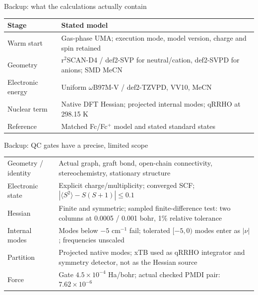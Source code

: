 \begin{frame}{Backup: what the calculations actually contain}
\centering\renewcommand{\arraystretch}{1.5}\small
\begin{tabular}{@{}lp{9.4cm}@{}}\toprule
Stage & Stated model\\\midrule
Warm start & Gas-phase UMA; execution mode, model version, charge and spin retained\\
Geometry & r$^2$SCAN-D4 / def2-SVP for neutral/cation, def2-SVPD for anions; SMD MeCN\\
Electronic energy & Uniform $\omega$B97M-V / def2-TZVPD, VV10, MeCN\\
Nuclear term & Native DFT Hessian; projected internal modes; qRRHO at 298.15 K\\
Reference & Matched Fc/Fc$^+$ model and stated standard states\\\bottomrule
\end{tabular}
\end{frame}

\begin{frame}{Backup: QC gates have a precise, limited scope}
\small\renewcommand{\arraystretch}{1.35}
\begin{tabular}{@{}lp{9.7cm}@{}}\toprule
Geometry / identity & Actual graph, graft bond, open-chain connectivity, stereochemistry, stationary structure\\
Electronic state & Explicit charge/multiplicity; converged SCF; $|\langle S^2\rangle-S(S+1)|\leq0.1$\\
Hessian & Finite and symmetric; sampled finite-difference test: two columns at 0.0005 / 0.001 bohr, 1\% relative tolerance\\
Internal modes & Modes below $-5$ cm$^{-1}$ fail; tolerated $[-5,0)$ modes enter as $|\nu|$; frequencies unscaled\\
Partition & Projected native modes; xTB used as qRRHO integrator and symmetry detector, not as the Hessian source\\
Force & Gate $4.5\times10^{-4}$ Ha/bohr; actual checked PMDI pair: $7.62\times10^{-6}$\\\bottomrule
\end{tabular}
\end{frame}

